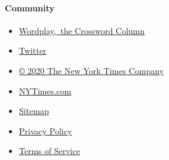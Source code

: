 \hypertarget{community}{%
\paragraph{Community}\label{community}}

\begin{itemize}
\tightlist
\item
  \href{https://nytimes.com/column/wordplay}{Wordplay,~the Crossword
  Column}
\item
  \href{https://twitter.com/NYTimesWordplay}{Twitter}
\end{itemize}

\begin{itemize}
\tightlist
\item
  \href{https://www.nytco.com}{© 2020 The New York Times Company}
\item
  \href{https://www.nytimes.com}{NYTimes.com}
\item
  \href{https://spiderbites.nytimes.com}{Sitemap}
\item
  \href{https://www.nytimes.com/subscription/privacy-policy\#/privacy}{Privacy
  Policy}
\item
  \href{https://help.nytimes.com/hc/en-us/articles/115014893428-Terms-of-service}{Terms
  of Service}
\end{itemize}
